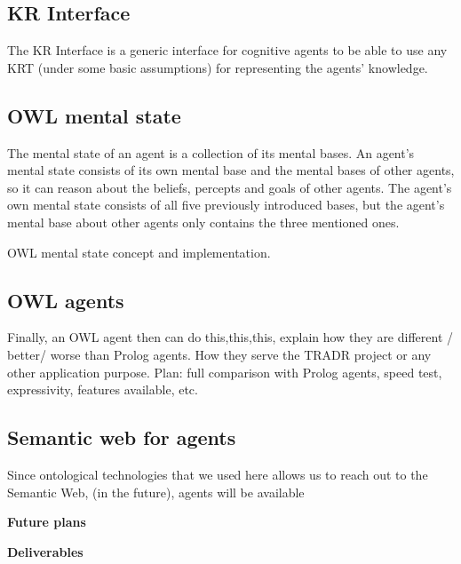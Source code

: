 \subsection{KR Interface}

The KR Interface is a generic interface for cognitive agents to be able to use any KRT (under some basic assumptions) for representing the agents' knowledge. 


\subsection{OWL mental state}

The mental state of an agent is a collection of its mental bases. An agent's mental state consists of its own mental base and the mental bases of other agents, so it can reason about the beliefs, percepts and goals of other agents. The agent's own mental state consists of all five previously introduced bases, but the agent's mental base about other agents only contains the three mentioned ones. 

OWL mental state concept and implementation.

\subsection{OWL agents}

Finally, an OWL agent then can do this,this,this, explain how they are different / better/ worse than Prolog agents. How they serve the TRADR project or any other application purpose. 
Plan: full comparison with Prolog agents, speed test, expressivity, features available, etc.

\subsection{Semantic web for agents}

Since ontological technologies that we used here allows us to reach out to the Semantic Web,
(in the future), agents will be available 


\textbf{Future plans}
 
\textbf{Deliverables}
  

  